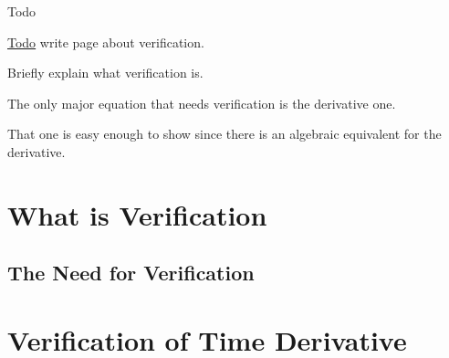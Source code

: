 \begin{DoxyRefDesc}{Todo}
\item[\hyperlink{todo__todo000045}{Todo}]write page about verification.
\begin{DoxyItemize}
\item Briefly explain what verification is.
\item The only major equation that needs verification is the derivative one.
\begin{DoxyItemize}
\item That one is easy enough to show since there is an algebraic equivalent for the derivative.
\end{DoxyItemize}
\end{DoxyItemize}\end{DoxyRefDesc}


\section*{What is Verification}

\subsection*{The Need for Verification}

\section*{Verification of Time Derivative}